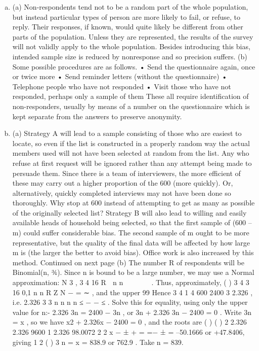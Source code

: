 \documentclass[a4paper,12pt]{article}
\begin{document}
\begin{enumerate}[(a)]
\item  (a) Non-respondents tend not to be a random part of the whole population,
but instead particular types of person are more likely to fail, or refuse,
to reply. Their responses, if known, would quite likely be different
from other parts of the population. Unless they are represented, the
results of the survey will not validly apply to the whole population.
Besides introducing this bias, intended sample size is reduced by nonresponse
and so precision suffers.
(b) Some possible procedures are as follows.
• Send the questionnaire again, once or twice more
• Send reminder letters (without the questionnaire)
• Telephone people who have not responded
• Visit those who have not responded, perhaps only a sample of them
These all require identification of non-responders, usually by means of
a number on the questionnaire which is kept separate from the answers
to preserve anonymity.
\item (a) Strategy A will lead to a sample consisting of those who are easiest to
locate, so even if the list is constructed in a properly random way the
actual members used will not have been selected at random from the
list. Any who refuse at first request will be ignored rather than any
attempt being made to persuade them. Since there is a team of
interviewers, the more efficient of these may carry out a higher
proportion of the 600 (more quickly). Or, alternatively, quickly
completed interviews may not have been done so thoroughly. Why
stop at 600 instead of attempting to get as many as possible of the
originally selected list?
Strategy B will also lead to willing and easily available heads of
household being selected, so that the first sample of (600 – m) could
suffer considerable bias. The second sample of m ought to be more
representative, but the quality of the final data will be affected by how
large m is (the larger the better to avoid bias). Office work is also
increased by this method.
Continued on next page
(b) The number R of respondents will be Binomial(n, ¾). Since n is bound
to be a large number, we may use a Normal approximation:
N 3 , 3
4 16
R  n n 
 
 
∼ .
Thus, approximately,
( )
3
4
3
16
0,1
n
n
R
Z N
−
= ∼ ,
and the upper 99%
Hence
3
4
1
4
600 2400 3 2.326 , i.e. 2.326
3 3
n n
n n
≤
− − ≤ .
Solve this for equality, using only the upper value for n:-
2.326 3n = 2400 − 3n , or 3n + 2.326 3n − 2400 = 0 .
Write 3n = x , so we have x2 + 2.326x − 2400 = 0 , and the roots are
( ) ( )
2 2.326 2.326 9600 1 2.326 98.0072
2 2
x
− ± +
= =− ±
= –50.1666 or +47.8406,
giving
1 2 ( )
3 n = x = 838.9 or 762.9 . Take n = 839.
\end{enumerate}
\end{document}
